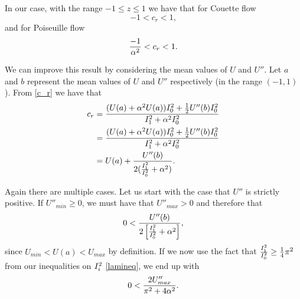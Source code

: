 In our case, with the range $ -1 \leq z \leq 1 $ we have that for Couette flow
\begin{equation}
    -1 < c_r < 1,
\end{equation}
and for Poiseuille flow
\begin{equation}
    \frac{-1}{\alpha^2} < c_r < 1.
\end{equation}




We can improve this result by considering the mean values of $ U $ and $ U'' $. Let $ a $ and $ b $ represent the mean values of $ U $ and $ U'' $ respectively (in the range $ (-1, 1) $). From \eqref{c_r} we have that 
\begin{align}
    c_r &= \frac{(U(a) + \alpha^2 U(a)) I^2_{0} + \tfrac{1}{2} U''(b) I^2_{0}}{I^2_{1} + \alpha^2 I^2_{0}} \nonumber\\
    &= \frac{(U(a) + \alpha^2 U(a)) I^2_{0} + \tfrac{1}{2} U''(b) I^2_{0}}{I^2_{1} + \alpha^2 I^2_{0}} \nonumber\\
    &= U(a) + \frac{U''(b)}{2(\tfrac{I^2_{1}}{I^2_{0}} + \alpha^2)}. \label{thm2cr}
\end{align}  

Again there are multiple cases. Let us start with the case that $ U''$ is strictly positive. If $ U''_{min} \geq 0 $, we must have that $ U''_{max} > 0 $ and therefore that
\begin{equation}
    0 < \frac{U''(b)}{2\left[\tfrac{I^2_{1}}{I^2_{0}} + \alpha^2\right]},
\end{equation}
since $ U_{min} < U(a) < U_{max} $ by definition. If we now use the fact that $ \frac{I^2_{1}}{I^2_{0}} \geq \tfrac{1}{4} \pi^2 $ from our inequalities on $ I^2_{i}$ \eqref{lamineq}, we end up with 
\begin{equation}
    0 < \frac{2 U''_{max}}{\pi^2 + 4 \alpha^2}. 
\end{equation}

